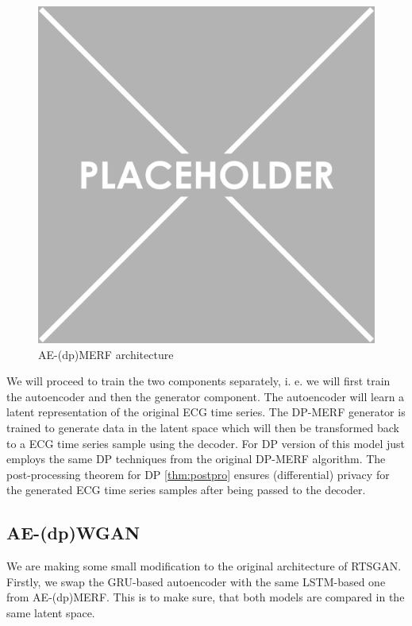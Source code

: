 \begin{figure}[h]
    \centering
    \includegraphics[scale=0.5]{../images/placeholder.png}
    \caption{AE-(dp)MERF architecture}
    \label{fig:aedpmerf_arch}
\end{figure}

We will proceed to train the two components separately, i. e. we will first train the autoencoder and then the generator component. The autoencoder will learn a latent representation of the original ECG time series. The DP-MERF generator is trained to generate data in the latent space which will then be transformed back to a ECG time series sample using the decoder. For DP version of this model just employs the same DP techniques from the original DP-MERF algorithm. The post-processing theorem for DP \cref{thm:postpro} ensures (differential) privacy for the generated ECG time series samples after being passed to the decoder.

\subsection{AE-(dp)WGAN}
We are making some small modification to the original architecture of RTSGAN. Firstly, we swap the GRU-based autoencoder with the same LSTM-based one from AE-(dp)MERF. This is to make sure, that both models are compared in the same latent space.


